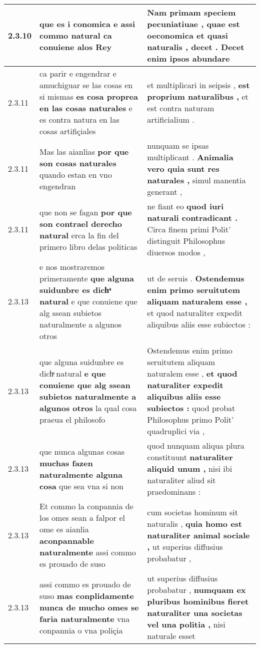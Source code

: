 \begin{tabular}{|p{1cm}|p{6.5cm}|p{6.5cm}|}
2.3.10 & que es i conomica \textbf{ e assi commo natural } ca conuiene alos Rey & Nam primam speciem pecuniatiuae , \textbf{ quae est oeconomica et quasi naturalis , decet . } Decet enim ipsos abundare \\\hline
2.3.11 & ca parir e engendrar e amuchiguar se las cosas en si mismas \textbf{ es cosa proprea en las cosas naturales } e es contra natura en las cosas artifiçiales & et multiplicari in seipsis , \textbf{ est proprium naturalibus , } et est contra naturam artificialium . \\\hline
2.3.11 & Mas las aianlias \textbf{ por que son cosas naturales } quando estan en vno engendran & nunquam se ipsas multiplicant . \textbf{ Animalia vero quia sunt res naturales , } simul manentia generant , \\\hline
2.3.11 & que non se fagan \textbf{ por que son contrael derecho natural } erca la fin del primero libro delas politicas & ne fiant eo \textbf{ quod iuri naturali contradicant . } Circa finem primi Polit’ distinguit Philosophus diuersos modos , \\\hline
2.3.13 & e nos mostraremos primeramente \textbf{ que alguna suidunbre es dichͣ natural } e que conuiene que alg ssean subietos naturalmente a algunos otros & ut de seruis . \textbf{ Ostendemus enim primo seruitutem aliquam naturalem esse , } et quod naturaliter expedit aliquibus aliis esse subiectos : \\\hline
2.3.13 & que alguna suidunbre es dichͣ natural \textbf{ e que conuiene que alg ssean subietos naturalmente a algunos otros } la qual cosa praeua el philosofo & Ostendemus enim primo seruitutem aliquam naturalem esse , \textbf{ et quod naturaliter expedit aliquibus aliis esse subiectos : } quod probat Philosophus primo Polit’ quadruplici via , \\\hline
2.3.13 & que nunca algunas cosas \textbf{ muchas fazen naturalmente alguna cosa } que sea vna si non & quod nunquam aliqua plura constituunt \textbf{ naturaliter aliquid unum , } nisi ibi naturaliter aliud sit praedominans : \\\hline
2.3.13 & Et commo la conpannia de los omes sean a falpor el ome es aianlia \textbf{ aconpannable naturalmente } assi commo es prouado de suso & cum societas hominum sit naturalis , \textbf{ quia homo est naturaliter animal sociale , } ut superius diffusius probabatur , \\\hline
2.3.13 & assi commo es prouado de suso \textbf{ mas conplidamente nunca de mucho omes se faria naturalmente } vna conpannia o vna poliçia & ut superius diffusius probabatur , \textbf{ numquam ex pluribus hominibus fieret naturaliter una societas vel una politia , } nisi naturale esset \\\hline

\end{tabular}

